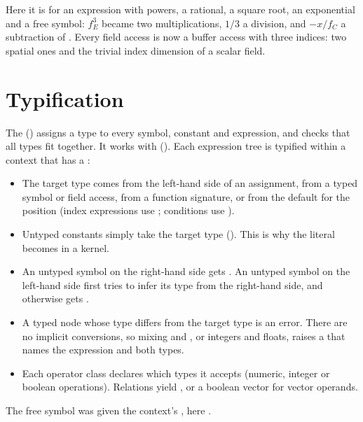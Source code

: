 Here it is for an expression with powers, a rational, a square root, an exponential and
a free symbol:
$f_E^3$ became two multiplications, $1/3$ a division, and $-x/f_C$ a subtraction of
. Every field access is now a buffer access with three indices: two
spatial ones and the trivial index dimension of a scalar field.

\section{Typification}\label{sec:typify}

The  () assigns a type to every symbol, constant
and expression, and checks that all types fit together. It works with
 (). Each expression tree is typified within a
context that has a :
\begin{itemize}
  \item The target type comes from the left-hand side of an assignment, from a typed
        symbol or field access, from a function signature, or from the default for the
        position (index expressions use ; conditions use ).
  \item Untyped constants simply take the target type (). This is why
        the literal  becomes  in a  kernel.
  \item An untyped symbol on the right-hand side gets . An untyped
        symbol on the left-hand side first tries to infer its type from the right-hand
        side, and otherwise gets .
  \item A typed node whose type differs from the target type is an error. There are no
        implicit conversions, so mixing  and , or integers and
        floats, raises a  that names the expression and both
        types.
  \item Each operator class declares which types it accepts (numeric, integer or
        boolean operations). Relations yield , or a boolean vector for vector
        operands.
\end{itemize}
The free symbol  was given the context's , here
.

